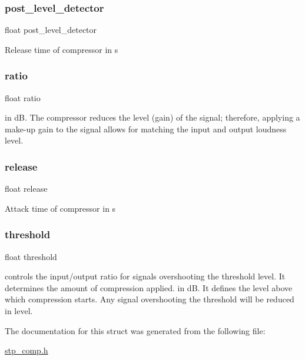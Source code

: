 \subsubsection{\texorpdfstring{post\+\_\+level\+\_\+detector}{post\_level\_detector}}
{\footnotesize\ttfamily float post\+\_\+level\+\_\+detector}

Release time of compressor in s \mbox{\label{structstp__comp_a207ad05f99cc72068a92358861ff5e71}} 
\subsubsection{\texorpdfstring{ratio}{ratio}}
{\footnotesize\ttfamily float ratio}

in dB. The compressor reduces the level (gain) of the signal; therefore, applying a make-\/up gain to the signal allows for matching the input and output loudness level. \mbox{\label{structstp__comp_a3dee5c7240d1c7d471a78f3457342ec7}} 
\subsubsection{\texorpdfstring{release}{release}}
{\footnotesize\ttfamily float release}

Attack time of compressor in s \mbox{\label{structstp__comp_a376acef8954eadc70f4b55e8e0588e13}} 
\subsubsection{\texorpdfstring{threshold}{threshold}}
{\footnotesize\ttfamily float threshold}

controls the input/output ratio for signals overshooting the threshold level. It determines the amount of compression applied. in dB. It defines the level above which compression starts. Any signal overshooting the threshold will be reduced in level. 

The documentation for this struct was generated from the following file\+:\begin{DoxyCompactItemize}
\item 
\mbox{\hyperlink{stp__comp_8h}{stp\+\_\+comp.\+h}}\end{DoxyCompactItemize}
